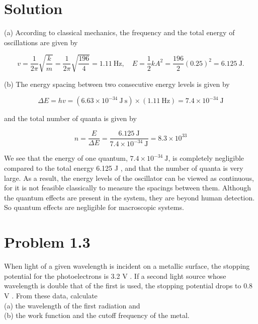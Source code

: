 \documentclass[10pt]{article}
\begin{document}
\section*{Solution}
(a) According to classical mechanics, the frequency and the total energy of oscillations are given by


\begin{equation*}
v=\frac{1}{2 \pi} \sqrt{\frac{k}{m}}=\frac{1}{2 \pi} \sqrt{\frac{196}{4}}=1.11 \mathrm{~Hz}, \quad E=\frac{1}{2} k A^{2}=\frac{196}{2}(0.25)^{2}=6.125 \mathrm{~J} . \tag{1.159}
\end{equation*}


(b) The energy spacing between two consecutive energy levels is given by


\begin{equation*}
\Delta E=h v=\left(6.63 \times 10^{-34} \mathrm{~J} \mathrm{~s}\right) \times(1.11 \mathrm{~Hz})=7.4 \times 10^{-34} \mathrm{~J} \tag{1.160}
\end{equation*}


and the total number of quanta is given by


\begin{equation*}
n=\frac{E}{\Delta E}=\frac{6.125 \mathrm{~J}}{7.4 \times 10^{-34} \mathrm{~J}}=8.3 \times 10^{33} \tag{1.161}
\end{equation*}


We see that the energy of one quantum, $7.4 \times 10^{-34} \mathrm{~J}$, is completely negligible compared to the total energy 6.125 J , and that the number of quanta is very large. As a result, the energy levels of the oscillator can be viewed as continuous, for it is not feasible classically to measure the spacings between them. Although the quantum effects are present in the system, they are beyond human detection. So quantum effects are negligible for macroscopic systems.

\section*{Problem 1.3}
When light of a given wavelength is incident on a metallic surface, the stopping potential for the photoelectrons is 3.2 V . If a second light source whose wavelength is double that of the first is used, the stopping potential drops to 0.8 V . From these data, calculate\\
(a) the wavelength of the first radiation and\\
(b) the work function and the cutoff frequency of the metal.
\end{document}
